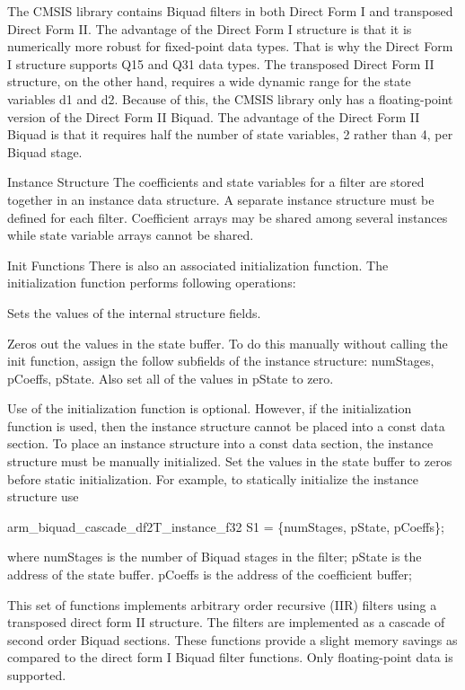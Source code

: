 \begin{DoxyParagraph}{}
The C\+M\+S\+IS library contains Biquad filters in both Direct Form I and transposed Direct Form II. The advantage of the Direct Form I structure is that it is numerically more robust for fixed-\/point data types. That is why the Direct Form I structure supports Q15 and Q31 data types. The transposed Direct Form II structure, on the other hand, requires a wide dynamic range for the state variables {\ttfamily d1} and {\ttfamily d2}. Because of this, the C\+M\+S\+IS library only has a floating-\/point version of the Direct Form II Biquad. The advantage of the Direct Form II Biquad is that it requires half the number of state variables, 2 rather than 4, per Biquad stage.
\end{DoxyParagraph}
\begin{DoxyParagraph}{Instance Structure}
The coefficients and state variables for a filter are stored together in an instance data structure. A separate instance structure must be defined for each filter. Coefficient arrays may be shared among several instances while state variable arrays cannot be shared.
\end{DoxyParagraph}
\begin{DoxyParagraph}{Init Functions}
There is also an associated initialization function. The initialization function performs following operations\+:
\begin{DoxyItemize}
\item Sets the values of the internal structure fields.
\item Zeros out the values in the state buffer. To do this manually without calling the init function, assign the follow subfields of the instance structure\+: num\+Stages, p\+Coeffs, p\+State. Also set all of the values in p\+State to zero.
\end{DoxyItemize}
\end{DoxyParagraph}
\begin{DoxyParagraph}{}
Use of the initialization function is optional. However, if the initialization function is used, then the instance structure cannot be placed into a const data section. To place an instance structure into a const data section, the instance structure must be manually initialized. Set the values in the state buffer to zeros before static initialization. For example, to statically initialize the instance structure use 
\begin{DoxyPre}
    arm\_biquad\_cascade\_df2T\_instance\_f32 S1 = \{numStages, pState, pCoeffs\};
\end{DoxyPre}
 where {\ttfamily num\+Stages} is the number of Biquad stages in the filter; {\ttfamily p\+State} is the address of the state buffer. {\ttfamily p\+Coeffs} is the address of the coefficient buffer;
\end{DoxyParagraph}
This set of functions implements arbitrary order recursive (I\+IR) filters using a transposed direct form II structure. The filters are implemented as a cascade of second order Biquad sections. These functions provide a slight memory savings as compared to the direct form I Biquad filter functions. Only floating-\/point data is supported.

